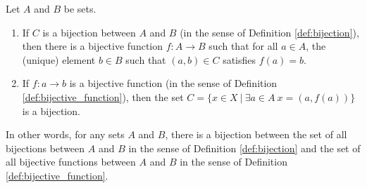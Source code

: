 \begin{theorem} Let $A$ and $B$ be sets.
\begin{enumerate}
    \item If $C$ is a bijection between $A$ and $B$ (in the sense of Definition \ref{def:bijection}), then there is a bijective function $f:A \to B$ such that for all $a \in A$, the (unique) element $b\in B$ such that $(a, b)\in C$ satisfies $f(a) = b$.
    \item If $f:a\to b$ is a bijective function (in the sense of Definition \ref{def:bijective_function}), then the set $C=\{x\in X\ |\ \exists a\in A\ x = (a,f(a))\}$ is a bijection.
\end{enumerate}
\end{theorem}
In other words, for any sets $A$ and $B$, there is a bijection between the set of all bijections between $A$ and $B$ in the sense of Definition \ref{def:bijection} and the set of all bijective functions between $A$ and $B$ in the sense of Definition \ref{def:bijective_function}.
